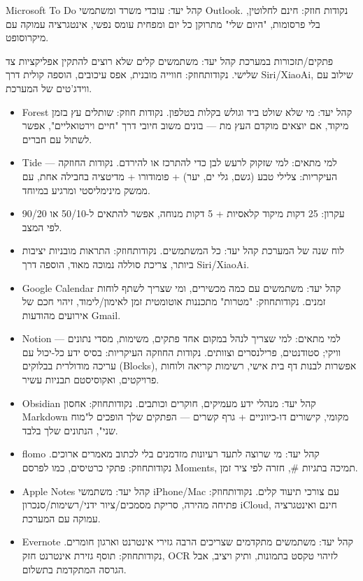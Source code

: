 Microsoft To Do קהל יעד: עובדי משרד ומשתמשי Outlook. נקודות חוזק: חינם לחלוטין, בלי פרסומות, "היום שלי" מתרוקן כל יום ומפחית עומס נפשי, אינטגרציה עמוקה עם מיקרוסופט.

פתקים/תזכורות במערכת קהל יעד: משתמשים קלים שלא רוצים להתקין אפליקציות צד שלישי. נקודותחוזק: חווייה מובנית, אפס עיכובים, הוספה קולית דרך Siri/XiaoAi, שילוב עם ווידג'טים של המערכת.


\begin{itemize}
  \item Forest קהל יעד: מי שלא שולט ביד וגולש בקלות בטלפון. נקודות חוזק: שותלים עץ בזמן מיקוד, אם יוצאים מוקדם העץ מת — בונים משוב חיובי דרך "חיים וירטואליים", אפשר לשתול עם חברים.
  \item Tide — למי מתאים: למי שזקוק לרעש לבן כדי להתרכז או להירדם. נקודות החוזקה העיקריות: צלילי טבע (גשם, גלי ים, יער) + פומודורו + מדיטציה בחבילה אחת, עם ממשק מינימליסטי ומרגיע במיוחד.
  \item עקרון: 25 דקות מיקוד קלאסיות + 5 דקות מנוחה, אפשר להתאים ל-50/10 או 90/20 לפי המצב.
\end{itemize}


\begin{itemize}
  \item לוח שנה של המערכת קהל יעד: כל המשתמשים. נקודותחוזק: התראות מובניות יציבות ביותר, צריכת סוללה נמוכה מאוד, הוספה דרך Siri/XiaoAi.
  \item Google Calendar קהל יעד: משתמשים עם כמה מכשירים, ומי שצריך לשתף לוחות זמנים. נקודותחוזק: "מטרות" מתכננות אוטומטית זמן לאימון/לימוד, זיהוי חכם של אירועים מהודעות Gmail.
\end{itemize}


\begin{itemize}
  \item Notion — למי מתאים: למי שצריך לנהל במקום אחד פתקים, משימות, מסדי נתונים וויקי; סטודנטים, פרילנסרים וצוותים. נקודות החוזקה העיקריות: בסיס ידע כל-יכול עם עריכה מודולרית בבלוקים (Blocks), אפשרות לבנות דף בית אישי, רשימות קריאה ולוחות פרויקטים, ואקוסיסטם תבניות עשיר.
  \item Obsidian קהל יעד: מנהלי ידע מעמיקים, חוקרים וכותבים. נקודותחוזק: אחסון Markdown מקומי, קישורים דו-כיווניים + גרף קשרים — הפתקים שלך הופכים ל"מוח שני", הנתונים שלך בלבד.
  \item flomo קהל יעד: מי שרוצה לתעד רעיונות מזדמנים בלי לכתוב מאמרים ארוכים. נקודותחוזק: פתקי כרטיסים, כמו לפרסם Moments, תמיכה בתגיות \#, חזרה לפי ציר זמן.
  \item Apple Notes קהל יעד: משתמשי iPhone/Mac עם צורכי תיעוד קלים. נקודותחוזק: פתיחה מהירה, סריקת מסמכים/ציור ידני/רשימות/סנכרון iCloud, חינם ואינטגרציה עמוקה עם המערכת.
  \item Evernote קהל יעד: משתמשים מתקדמים שצריכים הרבה גזירי אינטרנט וארגון חומרים. נקודותחוזק: תוסף גזירת אינטרנט חזק, OCR לזיהוי טקסט בתמונות, ותיק ויציב, אבל הגרסה המתקדמת בתשלום.
\end{itemize}

